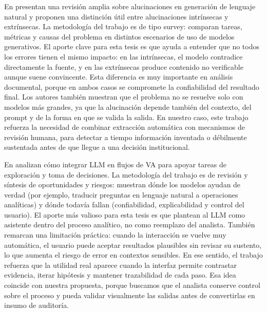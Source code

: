 En \cite{ji2023} presentan una revisión amplia sobre alucinaciones en generación de lenguaje natural y proponen una distinción útil entre alucinaciones intrínsecas y extrínsecas. La metodología del trabajo es de tipo survey: comparan tareas, métricas y causas del problema en distintos escenarios de uso de modelos generativos. El aporte clave para esta tesis es que ayuda a entender que no todos los errores tienen el mismo impacto: en las intrínsecas, el modelo contradice directamente la fuente, y en las extrínsecas produce contenido no verificable aunque suene convincente. Esta diferencia es muy importante en análisis documental, porque en ambos casos se compromete la confiabilidad del resultado final. Los autores también muestran que el problema no se resuelve solo con modelos más grandes, ya que la alucinación depende también del contexto, del prompt y de la forma en que se valida la salida. En nuestro caso, este trabajo refuerza la necesidad de combinar extracción automática con mecanismos de revisión humana, para detectar a tiempo información inventada o débilmente sustentada antes de que llegue a una decisión institucional.

En \cite{hutchinson2024llm} analizan cómo integrar \acs{LLM} en flujos de \acs{VA} para apoyar tareas de exploración y toma de decisiones. La metodología del trabajo es de revisión y síntesis de oportunidades y riesgos: muestran dónde los modelos ayudan de verdad (por ejemplo, traducir preguntas en lenguaje natural a operaciones analíticas) y dónde todavía fallan (confiabilidad, explicabilidad y control del usuario). El aporte más valioso para esta tesis es que plantean al \acs{LLM} como asistente dentro del proceso analítico, no como reemplazo del analista. También remarcan una limitación práctica: cuando la interacción se vuelve muy automática, el usuario puede aceptar resultados plausibles sin revisar su sustento, lo que aumenta el riesgo de error en contextos sensibles. En ese sentido, el trabajo refuerza que la utilidad real aparece cuando la interfaz permite contrastar evidencia, iterar hipótesis y mantener trazabilidad de cada paso. Esa idea coincide con nuestra propuesta, porque buscamos que el analista conserve control sobre el proceso y pueda validar visualmente las salidas antes de convertirlas en insumo de auditoría.

